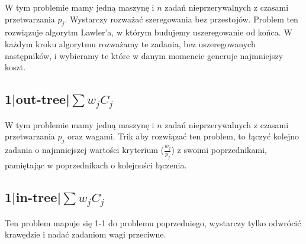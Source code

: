 \documentclass{../notatki}
\begin{document}
W tym problemie mamy jedną maszynę i $n$ zadań nieprzerywalnych z
czasami przetwarzania $p_j$.
Wystarczy rozważać szeregowania bez przestojów. Problem ten rozwiązuje
algorytm Lawler'a, w którym budujemy uszeregowanie od końca. W każdym kroku
algorytmu rozważamy te zadania, bez uszeregowanych następników, i wybieramy
te które w danym momencie generuje najmniejszy koszt.

\subsection{1|out-tree|\texorpdfstring{$\sum w_jC_j$}{sum wjCj}}

W tym problemie mamy jedną maszynę i $n$ zadań nieprzerywalnych z
czasami przetwarzania $p_j$ oraz wagami.
Trik aby rozwiązać ten problem, to łączyć kolejno zadania o
najmniejszej wartości
kryterium ($\frac{w_j}{p_j}$) z swoimi poprzednikami, pamiętając w poprzednikach
o kolejności łączenia.

\subsection{1|in-tree|\texorpdfstring{$\sum w_jC_j$}{sum wjCj}}

Ten problem mapuje się 1-1 do problemu poprzedniego, wystarczy tylko
odwrócić krawędzie i nadać zadaniom wagi przeciwne.
\end{document}
